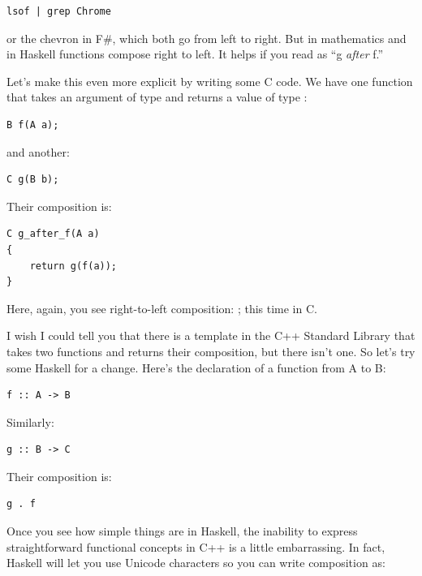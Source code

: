 \begin{Verbatim}[commandchars=\\\{\}]
lsof | grep Chrome
\end{Verbatim}
or the chevron \code{>>} in F\#, which both
go from left to right. But in mathematics and in Haskell functions
compose right to left. It helps if you read  as ``g \emph{after} f.''

Let's make this even more explicit by writing some C code. We have one
function  that takes an argument of type  and
returns a value of type :

\begin{Verbatim}[commandchars=\\\{\}]
B f(A a);
\end{Verbatim}
and another:

\begin{Verbatim}[commandchars=\\\{\}]
C g(B b);
\end{Verbatim}
Their composition is:

\begin{Verbatim}[commandchars=\\\{\}]
C g_after_f(A a)
{
    return g(f(a));
}
\end{Verbatim}
Here, again, you see right-to-left composition: ; this
time in C.

I wish I could tell you that there is a template in the C++ Standard
Library that takes two functions and returns their composition, but
there isn't one. So let's try some Haskell for a change. Here's the
declaration of a function from A to B:

\begin{Verbatim}[commandchars=\\\{\}]
f :: A -> B
\end{Verbatim}
Similarly:

\begin{Verbatim}[commandchars=\\\{\}]
g :: B -> C
\end{Verbatim}
Their composition is:

\begin{Verbatim}[commandchars=\\\{\}]
g . f
\end{Verbatim}
Once you see how simple things are in Haskell, the inability to express
straightforward functional concepts in C++ is a little embarrassing. In
fact, Haskell will let you use Unicode characters so you can write
composition as:

